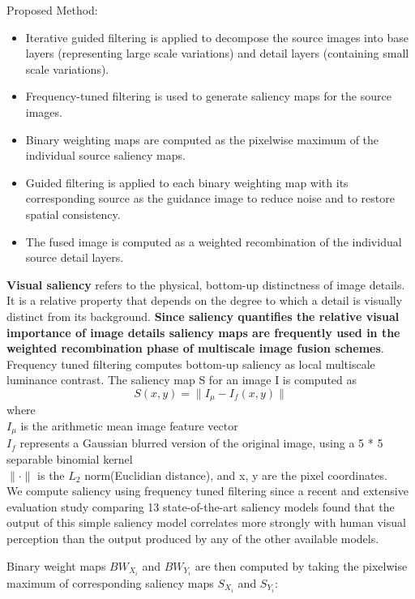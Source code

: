 Proposed Method:
\begin{itemize}
\item Iterative guided filtering is applied to decompose the source images into base layers (representing large scale variations) and detail layers (containing small scale variations).
\item Frequency-tuned filtering is used to generate saliency maps for the source images.
\item Binary weighting maps are computed as the pixelwise maximum of the individual source saliency maps.
\item Guided filtering is applied to each binary weighting map with its corresponding source as the guidance image to reduce noise and to restore spatial consistency.
\item The fused image is computed as a weighted recombination of the individual source detail layers.
\end{itemize}

\textbf{Visual saliency} refers to the physical, bottom-up distinctness of image details. It is a relative property that depends on the degree to which a detail is visually distinct from its background. {\bfseries \color{red} Since saliency quantifies the relative visual importance of image details saliency maps are frequently used in the weighted recombination phase of multiscale image fusion schemes}. Frequency tuned filtering computes bottom-up saliency as local multiscale luminance contrast. The saliency map S for an image I is computed as 
\begin{displaymath}
S(x, y) = \parallel I_\mu - I_f(x,y) \parallel 
\end{displaymath}
where\\
\indent $I_\mu$ is the arithmetic mean image feature vector\\
\indent $I_f$ represents a Gaussian blurred version of the original image, using a 5 * 5 separable binomial kernel\\
\indent $\parallel \cdot \parallel $ is the $L_2$ norm(Euclidian distance), and x, y are the pixel coordinates.\\
\indent We compute saliency using frequency tuned filtering since a recent and extensive evaluation study comparing 13 state-of-the-art saliency models found that the output of this simple saliency model correlates more strongly with human visual perception than the output produced by any of the other available models.

Binary weight maps $BW_{X_i}$ and $BW_{Y_i}$ are then computed by taking the pixelwise maximum of corresponding saliency maps $S_{X_i}$ and $S_{Y_i}$:

